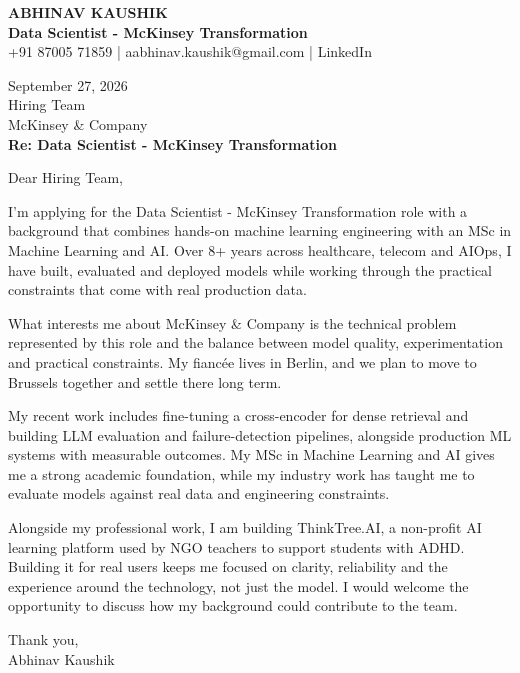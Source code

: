 \documentclass[10pt,a4paper]{article}
\begin{document}
\begin{center}
{\Large\bfseries ABHINAV KAUSHIK}\\[2pt]
{\bfseries Data Scientist - McKinsey Transformation}\\[2pt]
+91 87005 71859 \quad | \quad aabhinav.kaushik@gmail.com \quad | \quad LinkedIn
\end{center}
\vspace{8pt}
September 27, 2026\\[6pt]
Hiring Team\\
McKinsey \& Company\\[4pt]
\textbf{Re: Data Scientist - McKinsey Transformation}

Dear Hiring Team,

I’m applying for the Data Scientist - McKinsey Transformation role with a background that combines hands-on machine learning engineering with an MSc in Machine Learning and AI. Over 8+ years across healthcare, telecom and AIOps, I have built, evaluated and deployed models while working through the practical constraints that come with real production data.

What interests me about McKinsey \& Company is the technical problem represented by this role and the balance between model quality, experimentation and practical constraints. My fiancée lives in Berlin, and we plan to move to Brussels together and settle there long term.

My recent work includes fine-tuning a cross-encoder for dense retrieval and building LLM evaluation and failure-detection pipelines, alongside production ML systems with measurable outcomes. My MSc in Machine Learning and AI gives me a strong academic foundation, while my industry work has taught me to evaluate models against real data and engineering constraints.

Alongside my professional work, I am building ThinkTree.AI, a non-profit AI learning platform used by NGO teachers to support students with ADHD. Building it for real users keeps me focused on clarity, reliability and the experience around the technology, not just the model. I would welcome the opportunity to discuss how my background could contribute to the team.

Thank you,\\
Abhinav Kaushik
\end{document}
